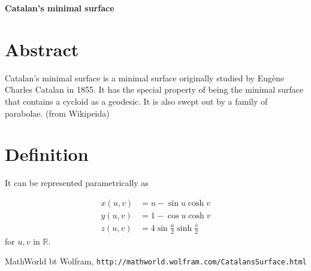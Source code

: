 \documentclass[12pt,dvipdfmx]{article}
\begin{document}
\begin{center}

{\bf \Large Catalan's minimal surface}

\end{center}


\section{Abstract}

Catalan's minimal surface is a minimal surface originally studied by Eug\`ene Charles Catalan in 1855.  
It has the special property of being the minimal surface that contains a cycloid as a geodesic. It is also swept out by a family of parabolae. (from Wikipeida)



\section{Definition}

It can be represented parametrically as

\begin{align*}
x(u,v)&	=	u-\sin u \cosh v	
\\
y(u,v)&	=	1-\cos u \cosh v	
\\
z(u,v)	&=	4 \sin \frac{u}{2} \sinh \frac{v}{2}
\end{align*}
for $u, v$ in $\mathbb{R}$.


\begin{thebibliography}{9}

 MathWorld bt Wolfram, \verb|http://mathworld.wolfram.com/CatalansSurface.html|

\end{thebibliography}
\end{document}

